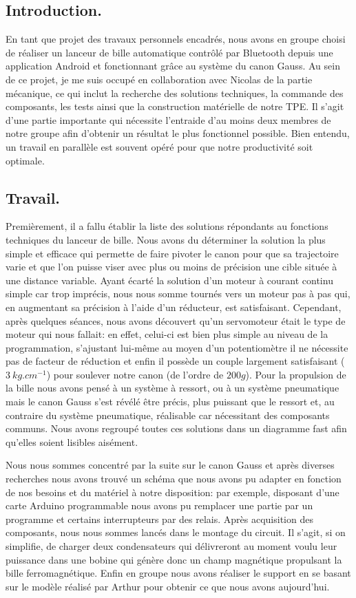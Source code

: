 \subsection{Introduction.}
En tant que projet des travaux personnels encadrés, nous avons en groupe choisi de réaliser un lanceur de bille automatique contrôlé par Bluetooth depuis une application Android et fonctionnant grâce au système du canon Gauss. Au sein de ce projet, je me suis occupé en collaboration avec Nicolas de la partie mécanique, ce qui inclut la recherche des solutions techniques, la commande des composants, les tests ainsi que la construction matérielle de notre TPE. Il s'agit d'une partie importante qui nécessite l'entraide d'au moins deux membres de notre groupe afin d'obtenir un résultat le plus fonctionnel possible. Bien entendu, un travail en parallèle est souvent opéré pour que notre productivité soit optimale.

\subsection{Travail.}
Premièrement, il a fallu établir la liste des solutions répondants au fonctions  techniques du lanceur de bille. Nous avons du déterminer la solution la plus simple et efficace qui permette de faire pivoter le canon pour que sa trajectoire varie et que l'on puisse viser avec plus ou moins de précision une cible située à une distance variable. Ayant écarté la solution d'un moteur à courant continu simple car trop imprécis, nous nous somme tournés vers un moteur pas à pas qui, en augmentant sa précision à l'aide d'un réducteur, est satisfaisant. Cependant, après quelques séances, nous avons découvert qu'un servomoteur était le type de moteur qui nous fallait: en effet, celui-ci est bien plus simple au niveau de la programmation, s'ajustant lui-même au moyen d'un potentiomètre il ne nécessite pas de facteur de réduction et enfin il possède un couple largement satisfaisant ($3\ kg.cm^{-1}$) pour soulever notre canon (de l'ordre de $200g$). Pour la propulsion de la bille nous avons pensé à un système à ressort, ou à un système pneumatique mais le canon Gauss s'est révélé être précis, plus puissant que le ressort et, au contraire du système pneumatique, réalisable car nécessitant des composants communs. Nous avons regroupé toutes ces solutions dans un diagramme fast afin qu'elles soient lisibles aisément.

Nous nous sommes concentré par la suite sur le canon Gauss et après diverses recherches nous avons trouvé un schéma que nous avons pu adapter en fonction de nos besoins et du matériel à notre disposition: par exemple, disposant d'une carte Arduino programmable nous avons pu remplacer une partie par un programme et certains interrupteurs par des relais. Après acquisition des composants, nous nous sommes lancés dans le montage du circuit. Il s'agit, si on simplifie, de charger deux condensateurs qui délivreront au moment voulu leur puissance dans une bobine qui génère donc un champ magnétique propulsant la bille ferromagnétique. Enfin en groupe nous avons réaliser le support en se basant sur le modèle réalisé par Arthur pour obtenir ce que nous avons aujourd'hui.

